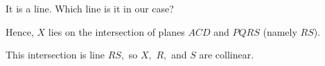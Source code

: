 










It is a line. Which line is it in our case?







Hence, $X$ lies on the intersection of planes $ACD$ and $PQRS$ (namely $RS$).


This intersection is line $RS,$ so $X,$ $R,$ and $S$ are collinear.




